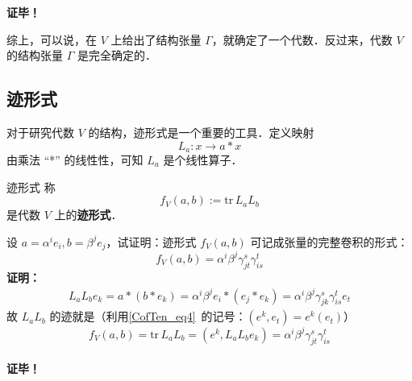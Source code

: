 \textbf{证毕！}

综上，可以说，在 $V$ 上给出了结构张量 $\Gamma$，就确定了一个代数．反过来，代数 $V$ 的结构张量 $\Gamma$ 是完全确定的．
\subsection{迹形式}
对于研究代数 $V$ 的结构，迹形式是一个重要的工具．定义映射
\begin{equation}
L_a:x\rightarrow a*x
\end{equation}
由乘法 “*” 的线性性，可知 $L_a$ 是个线性算子．
\begin{definition}{迹形式}
称
\begin{equation}
f_V(a,b):=\mathrm{tr}\, L_aL_b
\end{equation}
是代数 $V$ 上的\textbf{迹形式}．
\end{definition}
\begin{example}{}\label{STAlg_ex1}
设 $a=\alpha^i e_i,b=\beta^j e_j$，试证明：迹形式 $f_V(a,b)$ 可记成张量的完整卷积的形式：
\begin{equation}
f_V(a,b)=\alpha^i\beta^j\gamma_{jt}^s\gamma_{is}^t
\end{equation}
\textbf{证明：}
\begin{equation}
\begin{aligned}
L_aL_b e_k=a*(b*e_k)=\alpha^i\beta^je_i*(e_j*e_k)=\alpha^i\beta^j\gamma_{jk}^s \gamma_{is}^t e_t
\end{aligned}
\end{equation}
故 $L_aL_b$ 的迹就是（利用\autoref{CofTen_eq4}~的记号：$(e^k,e_t)=e^k(e_t)$）
\begin{equation}
f_V(a,b)=\mathrm{tr}\, L_a L_b=(e^k,L_aL_b e_k)=\alpha^i\beta^j\gamma_{jt}^s \gamma_{is}^t
\end{equation}\\
\textbf{证毕！}
\end{example}

